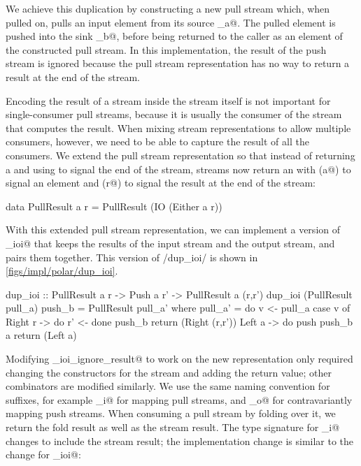 We achieve this duplication by constructing a new pull stream which, when pulled on, pulls an input element from its source \Hs@pull_a@.
The pulled element is pushed into the sink \Hs@push_b@, before being returned to the caller as an element of the constructed pull stream.
In this implementation, the result of the push stream is ignored because the pull stream representation has no way to return a result at the end of the stream.

Encoding the result of a stream inside the stream itself is not important for single-consumer pull streams, because it is usually the consumer of the stream that computes the result.
When mixing stream representations to allow multiple consumers, however, we need to be able to capture the result of all the consumers.
We extend the pull stream representation so that instead of returning a \Hs@Maybe@ and using \Hs@Nothing@ to signal the end of the stream, streams now return an \Hs@Either@ with (\Hs@Left a@) to signal an element and (\Hs@Right r@) to signal the result at the end of the stream:

\begin{haskell}
data PullResult a r = PullResult (IO (Either a r))
\end{haskell}

With this extended pull stream representation, we can implement a version of \Hs@dup_ioi@ that keeps the results of the input stream and the output stream, and pairs them together.
This version of \Hs/dup_ioi/ is shown in \cref{figs/impl/polar/dup_ioi}.

\begin{haskell}[float,caption=Polarised implementation of \Hs/dup_ioi/,label=figs/impl/polar/dup_ioi]
dup_ioi :: PullResult a r -> Push a r' -> PullResult a (r,r')
dup_ioi (PullResult pull_a) push_b = PullResult pull_a'
 where
  pull_a' = do
    v <- pull_a
    case v of
     Right r -> do
      r' <- done push_b
      return (Right (r,r'))
     Left a -> do
      push push_b a
      return (Left a)
\end{haskell}

Modifying \Hs@dup_ioi_ignore_result@ to work on the new representation only required changing the constructors for the stream and adding the return value; other combinators are modified similarly.
We use the same naming convention for suffixes, for example \Hs@map_i@ for mapping pull streams, and \Hs@map_o@ for contravariantly mapping push streams.
When consuming a pull stream by folding over it, we return the fold result as well as the stream result.
The type signature for \Hs@foldl_i@ changes to include the stream result; the implementation change is similar to the change for \Hs@dup_ioi@:

